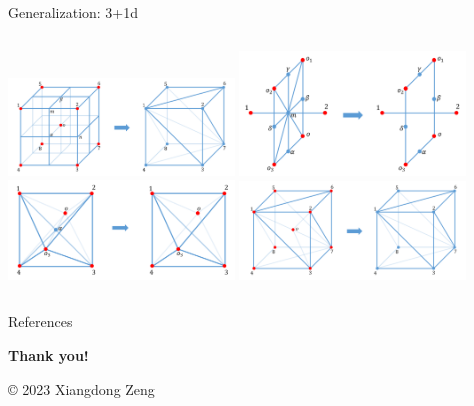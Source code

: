 \documentclass{fdubeamer}
\newcommand{\1}{\mathbb{1}}
\begin{document}
\begin{frame}{Generalization: 3+1d}
\begin{columns}[c]
    \centering
    \includegraphics[width=0.45\textwidth]{images/holographic/rg-3+1d.png} \quad
    \includegraphics[width=0.45\textwidth]{images/holographic/rg-3+1d-step-1.png} \\
    \includegraphics[width=0.45\textwidth]{images/holographic/rg-3+1d-step-2.png} \quad
    \includegraphics[width=0.45\textwidth]{images/holographic/rg-3+1d-step-3.png}

\end{columns}

\end{frame}

\begin{frame}{References}
  \tiny
  
\end{frame}

\begingroup
  \begin{frame}[plain]
    \vfill
    \begin{center}
      \color{white}
      \LARGE
      \textbf{Thank you!} \par
      \vspace{6em}
      \tiny
      \copyright{} 2023 Xiangdong Zeng
    \end{center}
    \vspace{-8em}
  \end{frame}
\endgroup
\end{document}
